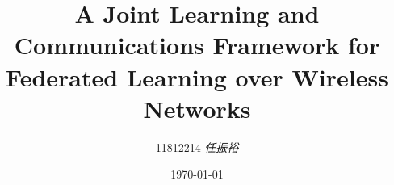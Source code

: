 \author{11812214 \textit{任振裕}}
\title{A Joint Learning and Communications Framework
for Federated Learning over Wireless Networks}
\date{\today}




